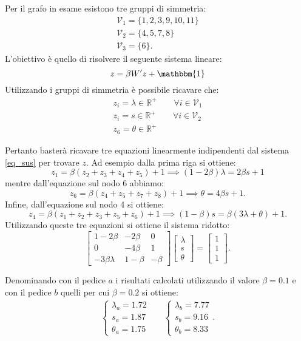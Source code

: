 \begin{alphaparts}
\questionpart %
Per il grafo in esame esistono tre gruppi di simmetria:
\begin{gather*}
    \mathcal{V}_1 = \{ 1,2,3,9,10,11\} \\
    \mathcal{V}_2 = \{ 4,5,7,8\}\\
    \mathcal{V}_3 = \{6\}.
\end{gather*}
L'obiettivo è quello di risolvere il seguente sistema lineare:
\begin{equation} \label{eq_sus}
    z = \beta W' z + \mathbbm{1}
\end{equation}
Utilizzando i gruppi di simmetria è possibile ricavare che:
\begin{gather*}
    z_i = \lambda \in \mathbb{R}^+ \quad \quad \forall i \in \mathcal{V}_1\\
    z_i = s \in \mathbb{R}^+ \quad \quad \forall i \in \mathcal{V}_2\\
    z_6 = \theta \in \mathbb{R}^+ 
\end{gather*}

Pertanto basterà ricavare tre equazioni linearmente indipendenti dal sistema \ref{eq_sus} per trovare \(z\). Ad esempio dalla prima riga si ottiene:
\[z_1 = \beta(z_2+ z_3+ z_4+ z_5)+ 1 \implies (1- 2\beta)\lambda = 2\beta s + 1\]
mentre dall'equazione sul nodo 6 abbiamo:
\[z_6 = \beta(z_4 + z_5 + z_7 + z_8) + 1 \implies \theta = 4\beta s + 1.\]
Infine, dall'equazione sul nodo 4 si ottiene:
\[z_4 = \beta (z_1 + z_2 + z_3 + z_5 + z_6) + 1 \implies (1- \beta) s = \beta (3 \lambda + \theta) + 1.\]
Utilizzando queste tre equazioni si ottiene il sistema ridotto:
\[
\begin{bmatrix}
     1- 2\beta & - 2\beta & 0 \\
     0 & - 4\beta & 1 \\
    - 3\beta\lambda & 1- \beta & - \beta
\end{bmatrix}
\begin{bmatrix} \lambda \\ s \\ \theta \end{bmatrix} =
\begin{bmatrix} 1 \\ 1 \\ 1 \end{bmatrix}.     
\]

Denominando con il pedice \(a\) i risultati calcolati utilizzando il valore \(\beta = 0.1\) e con il pedice \(b\) quelli per cui \(\beta = 0.2\) si ottiene:
\begin{align*}
    \begin{cases}
      \lambda_a = 1.72 \\
      s_a = 1.87 \\
      \theta_a = 1.75
    \end{cases} && \begin{cases}
      \lambda_b = 7.77 \\
      s_b = 9.16 \\
      \theta_b = 8.33
    \end{cases}.
  \end{align*}


\end{alphaparts}
